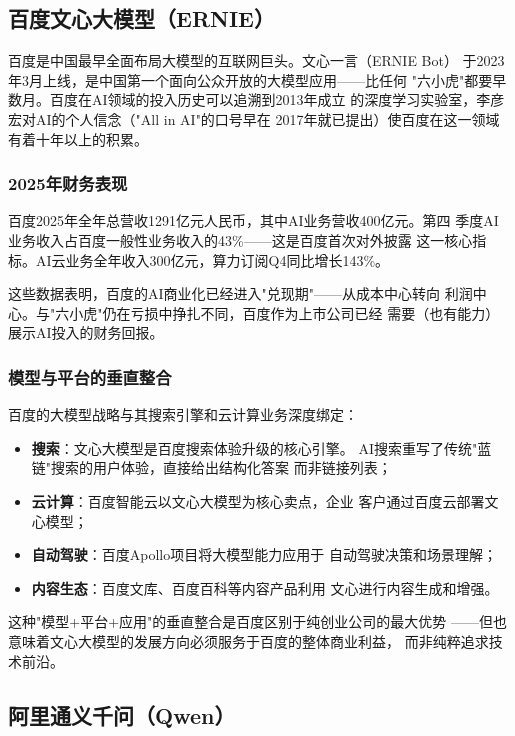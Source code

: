 \subsection{百度文心大模型（ERNIE）}
\label{subsec:ernie}

百度是中国最早全面布局大模型的互联网巨头。文心一言（ERNIE Bot）
于2023年3月上线，是中国第一个面向公众开放的大模型应用——比任何
"六小虎"都要早数月。百度在AI领域的投入历史可以追溯到2013年成立
的深度学习实验室，李彦宏对AI的个人信念（"All in AI"的口号早在
2017年就已提出）使百度在这一领域有着十年以上的积累。

\subsubsection{2025年财务表现}
百度2025年全年总营收1291亿元人民币，其中AI业务营收400亿元。第四
季度AI业务收入占百度一般性业务收入的43\%——这是百度首次对外披露
这一核心指标。AI云业务全年收入300亿元，算力订阅Q4同比增长143\%。

这些数据表明，百度的AI商业化已经进入"兑现期"——从成本中心转向
利润中心。与"六小虎"仍在亏损中挣扎不同，百度作为上市公司已经
需要（也有能力）展示AI投入的财务回报。

\subsubsection{模型与平台的垂直整合}
百度的大模型战略与其搜索引擎和云计算业务深度绑定：
\begin{itemize}
  \item \textbf{搜索}：文心大模型是百度搜索体验升级的核心引擎。
    AI搜索重写了传统"蓝链"搜索的用户体验，直接给出结构化答案
    而非链接列表；
  \item \textbf{云计算}：百度智能云以文心大模型为核心卖点，企业
    客户通过百度云部署文心模型；
  \item \textbf{自动驾驶}：百度Apollo项目将大模型能力应用于
    自动驾驶决策和场景理解；
  \item \textbf{内容生态}：百度文库、百度百科等内容产品利用
    文心进行内容生成和增强。
\end{itemize}

这种"模型+平台+应用"的垂直整合是百度区别于纯创业公司的最大优势
——但也意味着文心大模型的发展方向必须服务于百度的整体商业利益，
而非纯粹追求技术前沿。

\subsection{阿里通义千问（Qwen）}
\label{subsec:tongyi}

